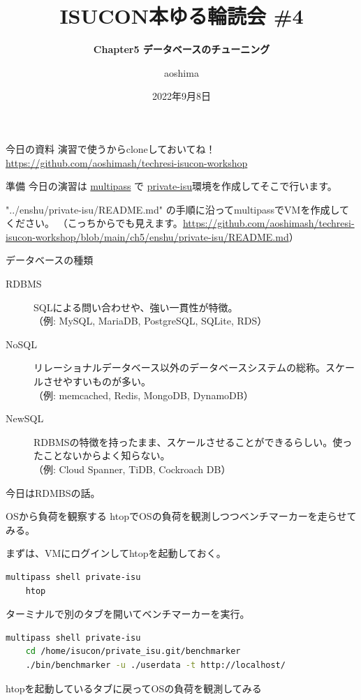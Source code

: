 \documentclass{beamer}
\title{\bfseries ISUCON本ゆる輪読会 \#4}
\subtitle{\bfseries Chapter5 データベースのチューニング}
\author{aoshima}
\date{2022年9月8日}
\begin{document}
\begin{frame}
  \titlepage
\end{frame}

\begin{frame}{今日の資料}
  演習で使うからcloneしておいてね！
  \href{https://github.com/aoshimash/techresi-isucon-workshop}{https://github.com/aoshimash/techresi-isucon-workshop}
\end{frame}

\begin{frame}{準備}
  今日の演習は \href{https://multipass.run/}{multipass} で \href{https://github.com/catatsuy/private-isu}{private-isu}環境を作成してそこで行います。\par
  "../enshu/private-isu/README.md" の手順に沿ってmultipassでVMを作成してください。\newline
  （こっちからでも見えます。\href{https://github.com/aoshimash/techresi-isucon-workshop/blob/main/ch5/enshu/private-isu/README.md}{https://github.com/aoshimash/techresi-isucon-workshop/blob/main/ch5/enshu/private-isu/README.md}）
\end{frame}

\begin{frame}{データベースの種類}

  \begin{description}
    \item[RDBMS]SQLによる問い合わせや、強い一貫性が特徴。\\（例: MySQL, MariaDB, PostgreSQL, SQLite, RDS）
    \item[NoSQL]リレーショナルデータベース以外のデータベースシステムの総称。スケールさせやすいものが多い。\\（例: memcached, Redis, MongoDB, DynamoDB）
    \item[NewSQL]RDBMSの特徴を持ったまま、スケールさせることができるらしい。使ったことないからよく知らない。\\（例: Cloud Spanner, TiDB, Cockroach DB）
  \end{description}

  今日はRDMBSの話。

\end{frame}

\begin{frame}[fragile]{OSから負荷を観察する}
  htopでOSの負荷を観測しつつベンチマーカーを走らせてみる。\par
  まずは、VMにログインしてhtopを起動しておく。
  \begin{lstlisting}[language=bash, basicstyle=\tiny]
    multipass shell private-isu
    htop
  \end{lstlisting}
  ターミナルで別のタブを開いてベンチマーカーを実行。
  \begin{lstlisting}[language=bash, basicstyle=\tiny]
    multipass shell private-isu
    cd /home/isucon/private_isu.git/benchmarker
    ./bin/benchmarker -u ./userdata -t http://localhost/
  \end{lstlisting}
  htopを起動しているタブに戻ってOSの負荷を観測してみる
\end{frame}
\end{document}

